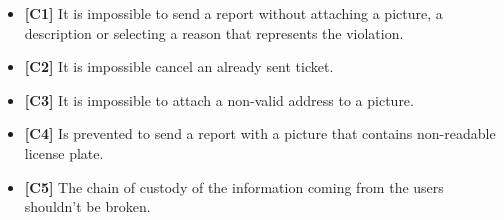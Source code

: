 \begin{itemize}
		\item \textbf{[\hypertarget{C1}{C1}]} It is impossible to send a report without attaching a picture, a description or selecting a reason that represents the violation. 
		\item \textbf{[\hypertarget{C2}{C2}]} It is impossible cancel an already sent ticket. 
		\item \textbf{[\hypertarget{C3}{C3}]} It is impossible to attach a non-valid address to a picture. %
		\item \textbf{[\hypertarget{C4}{C4}]} Is prevented to send a report with a picture that contains non-readable license plate. 
		\item \textbf{[\hypertarget{C5}{C5}]} The chain of custody of the information coming from the users shouldn't be broken. %
		
	\end{itemize}
